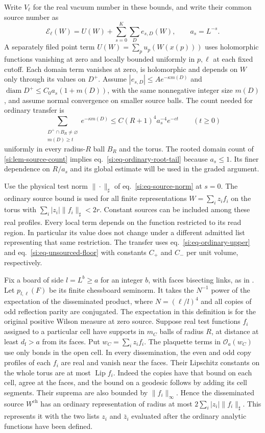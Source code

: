 \documentclass[11pt,letterpaper,reqno]{amsart}
\numberwithin{equation}{section}
\renewcommand{\eqref}[1]{\textup{eq.~\ref{#1}}}
\theoremstyle{definition}
\theoremstyle{remark}
\begin{document}
Write $V_\ell$ for the real vacuum number in these bounds, and
write their common source number as
\[
 \mathcal E_\ell(W)=U(W)+\sum_{s=0}^K\sum_D e_{s,D}(W),
 \qquad a_s=L^{-s}.
\]
A separately filed point term $U(W)=\sum_p u_p(W(x(p)))$ uses
holomorphic functions vanishing at zero and locally bounded
uniformly in $p,\ell$ at each fixed cutoff. Each domain term
vanishes at zero, is holomorphic and depends on $W$ only through
its values on $D^+$. Assume
$|e_{s,D}|\le A e^{-\kappa m(D)}$ and
$\operatorname{diam}D^+\le C_0 a_s(1+m(D))$, with the same
nonnegative integer size $m(D)$, and assume normal convergence on
smaller source balls. The count needed for ordinary transfer is
\begin{equation}\label{si:eq-ordinary-root-tail}
 \sum_{\substack{D^+\cap B_R\ne\varnothing\\m(D)\ge t}}
 e^{-\kappa m(D)}
 \le C(R+1)^4a_s^{-4}e^{-ct}
 \qquad(t\ge0)
\end{equation}
uniformly in every radius-$R$ ball $B_R$ and the torus. The
rooted domain count of \cref{si:lem-source-count} implies
\eqref{si:eq-ordinary-root-tail} because $a_s\le1$. Its finer
dependence on $R/a_s$ and its global estimate will be used in
the graded argument.

Use the physical test norm $\|\cdot\|_\sharp$ of
\eqref{si:eq-source-norm} at $s=0$. The ordinary source bound is used for all finite
representations $W=\sum_i z_i f_i$ on the torus with
$\sum_i|z_i|\|f_i\|_\sharp<2r$. Constant sources can be included
among these real profiles. Every local term depends on the function
restricted to its read region. In particular its value does not
change under a different admitted list representing that same
restriction. The transfer uses \eqref{si:eq-ordinary-upper} and
\eqref{si:eq-unsourced-floor} with constants $C_+$ and $C_-$ per
unit volume, respectively.

Fix a board of side $l=L^b\ge a$ for an integer $b$, with faces
bisecting links, as in \cite[Theorem~C]{LP}. Let
$p_{l,\ell}(F)$ be its finite chessboard seminorm. It takes the
$N^{-1}$ power of the expectation of the disseminated product,
where $N=(\ell/l)^4$ and all copies of odd reflection parity are
conjugated. The expectation in this definition is for the original
positive Wilson measure at zero source. Suppose real test functions
$f_i$ assigned to a particular cell have supports in $m_C$ balls
of radius $R$, at distance at least $d_{\mathrm f}>a$ from its
faces. Put $w_C=\sum_i z_if_i$. The plaquette terms in
$\mathcal O_a(w_C)$ use only bonds in the open cell. In every
dissemination, the even and odd copy profiles of each $f_i$ are
real and vanish near the faces. Their Lipschitz constants on the
whole torus are at most $\operatorname{Lip}f_i$. Indeed the copies
have that bound on each cell, agree at the faces, and the bound on
a geodesic follows by adding its cell segments. Their suprema
are also bounded by $\|f_i\|_\infty$. Hence the disseminated source
$W^{\mathrm{ch}}$ has an ordinary representation of radius at
most $2\sum_i|z_i|\|f_i\|_\sharp$. This represents it with the two
lists $z_i$ and $\bar z_i$ evaluated after the ordinary analytic
functions have been defined.
\end{document}
